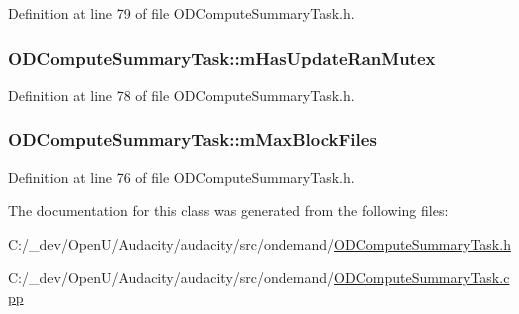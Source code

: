 Definition at line 79 of file O\+D\+Compute\+Summary\+Task.\+h.

\subsubsection[{\texorpdfstring{m\+Has\+Update\+Ran\+Mutex}{mHasUpdateRanMutex}}]{ O\+D\+Compute\+Summary\+Task\+::m\+Has\+Update\+Ran\+Mutex\hspace{0.3cm}{\ttfamily [protected]}}\hypertarget{class_o_d_compute_summary_task_a7df3770e2254fc12c16be67401ceaab4}{}\label{class_o_d_compute_summary_task_a7df3770e2254fc12c16be67401ceaab4}


Definition at line 78 of file O\+D\+Compute\+Summary\+Task.\+h.

\subsubsection[{\texorpdfstring{m\+Max\+Block\+Files}{mMaxBlockFiles}}]{ O\+D\+Compute\+Summary\+Task\+::m\+Max\+Block\+Files\hspace{0.3cm}{\ttfamily [protected]}}\hypertarget{class_o_d_compute_summary_task_a0a0d29cc904dc42a7060c396ac3bf391}{}\label{class_o_d_compute_summary_task_a0a0d29cc904dc42a7060c396ac3bf391}


Definition at line 76 of file O\+D\+Compute\+Summary\+Task.\+h.



The documentation for this class was generated from the following files\+:\begin{DoxyCompactItemize}
\item 
C\+:/\+\_\+dev/\+Open\+U/\+Audacity/audacity/src/ondemand/\hyperlink{_o_d_compute_summary_task_8h}{O\+D\+Compute\+Summary\+Task.\+h}\item 
C\+:/\+\_\+dev/\+Open\+U/\+Audacity/audacity/src/ondemand/\hyperlink{_o_d_compute_summary_task_8cpp}{O\+D\+Compute\+Summary\+Task.\+cpp}\end{DoxyCompactItemize}
